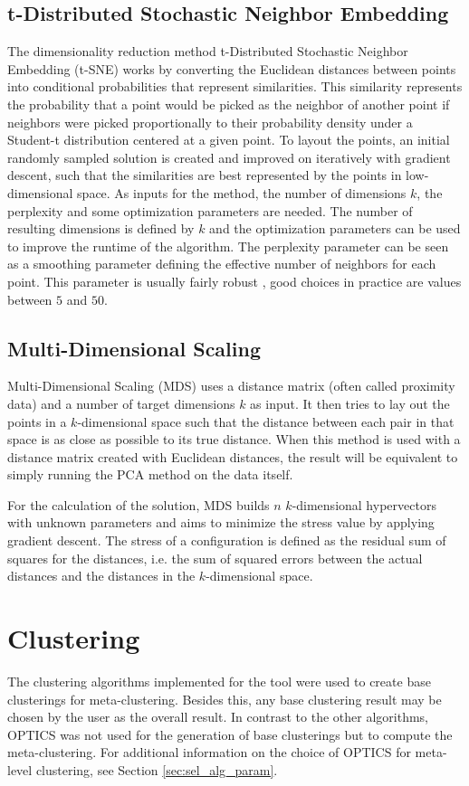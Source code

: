 \documentclass[
	a4paper,
	english,
	twoside,
	openright,               
	11pt                            
	]{report}
\begin{document}
\subsection{t-Distributed Stochastic Neighbor Embedding}
The dimensionality reduction method t-Distributed Stochastic Neighbor Embedding (t-SNE) \cite{Maaten2008VisualizingDU} works by converting the Euclidean distances between points into conditional probabilities that represent similarities. This similarity represents the probability that a point would be picked as the neighbor of another point if neighbors were picked proportionally to their probability density under a Student-t distribution centered at a given point. To layout the points, an initial randomly sampled solution is created and improved on iteratively with gradient descent, such that the similarities are best represented by the points in low-dimensional space. As inputs for the method, the number of dimensions $k$, the perplexity and some optimization parameters are needed. The number of resulting dimensions is defined by $k$ and the optimization parameters can be used to improve the runtime of the algorithm. The perplexity parameter can be seen as a smoothing parameter defining the effective number of neighbors for each point. This parameter is usually fairly robust \cite{Maaten2008VisualizingDU}, good choices in practice are values between $5$ and $50$.

\subsection{Multi-Dimensional Scaling}
Multi-Dimensional Scaling (MDS) \cite{mds} uses a distance matrix (often called proximity data) and a number of target dimensions $k$ as input. It then tries to lay out the points in a $k$-dimensional space such that the distance between each pair in that space is as close as possible to its true distance. When this method is used with a distance matrix created with Euclidean distances, the result will be equivalent to simply running the PCA method on the data itself. 

For the calculation of the solution, MDS builds $n$ $k$-dimensional hypervectors with unknown parameters and aims to minimize the stress value by applying gradient descent. The stress of a configuration is defined as the residual sum of squares for the distances, i.e. the sum of squared errors between the actual distances and the distances in the $k$-dimensional space.

\section{Clustering}\label{theory_clustering}
The clustering algorithms implemented for the tool were used to create base clusterings for meta-clustering. Besides this, any base clustering result may be chosen by the user as the overall result. In contrast to the other algorithms, OPTICS was not used for the generation of base clusterings but to compute the meta-clustering. For additional information on the choice of OPTICS for meta-level clustering, see Section \ref{sec:sel_alg_param}.
\end{document}
